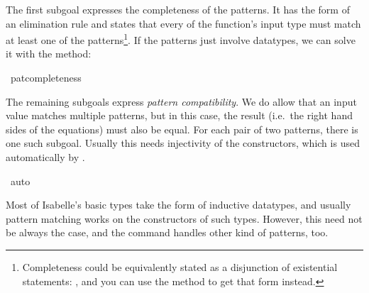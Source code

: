 \begin{isabellebody}
\begin{isamarkuptxt}
  The first subgoal expresses the completeness of the patterns. It has
  the form of an elimination rule and states that every  of
  the function's input type must match at least one of the patterns\footnote{Completeness could
  be equivalently stated as a disjunction of existential statements: 
, and you can use the method  to get that form instead.}. If the patterns just involve
  datatypes, we can solve it with the 
  method:%
\end{isamarkuptxt}%
\isamarkuptrue%
\isamarkupfalse%
\ pat{\isacharunderscore}completeness%
\begin{isamarkuptxt}%
The remaining subgoals express \emph{pattern compatibility}. We do
  allow that an input value matches multiple patterns, but in this
  case, the result (i.e.~the right hand sides of the equations) must
  also be equal. For each pair of two patterns, there is one such
  subgoal. Usually this needs injectivity of the constructors, which
  is used automatically by .%
\end{isamarkuptxt}%
\isamarkuptrue%
\isamarkupfalse%
\ auto%
\endisatagproof
{\isafoldproof}%
%
\isadelimproof
%
\endisadelimproof
%
\isamarkuptrue%
%
\begin{isamarkuptext}%
Most of Isabelle's basic types take the form of inductive datatypes,
  and usually pattern matching works on the constructors of such types. 
  However, this need not be always the case, and the 
  command handles other kind of patterns, too.


\end{isamarkuptext}
\end{isabellebody}
